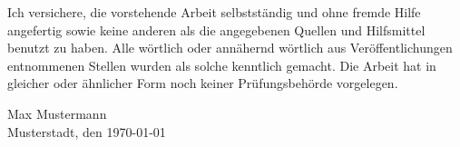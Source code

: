 \begin{declaration-of-authorship}
    Ich versichere, die vorstehende Arbeit selbstständig und ohne fremde Hilfe angefertig sowie keine anderen als die angegebenen Quellen und Hilfsmittel benutzt zu haben.
    Alle wörtlich oder annähernd wörtlich aus Veröffentlichungen entnommenen Stellen wurden als solche kenntlich gemacht.
    Die Arbeit hat in gleicher oder ähnlicher Form noch keiner Prüfungsbehörde vorgelegen.

    \vspace{4em}
    \noindent Max Mustermann\\
    Musterstadt, den \today
\end{declaration-of-authorship}